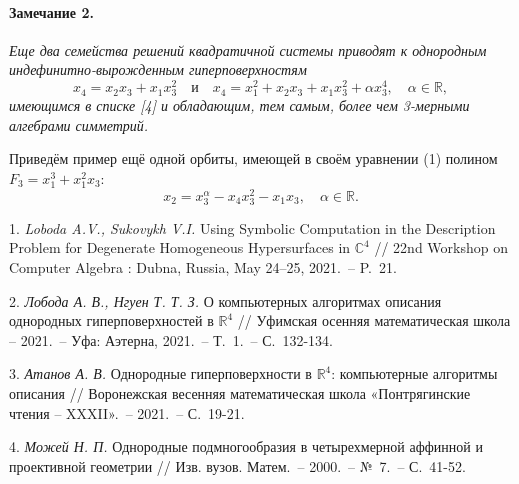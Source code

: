 \paragraph{Замечание 2.} {\it
	Еще два семейства решений квадратичной системы приводят к однородным индефинитно-вы\-рож\-ден\-ным гиперповерхностям
	\begin{equation*}
		x_4 = x_2 x_3 + x_1 x_3^2 \quad \text{и} \quad x_4 = x_1^2 + x_2 x_3 + x_1 x_3^2 + \alpha x_3^4,  \quad \alpha \in \mathbb{R},
	\end{equation*}
	имеющимся в списке [4] и обладающим, тем самым, более чем 3-мерными алгебрами симметрий. 
}

Приведём пример ещё одной орбиты, имеющей в своём уравнении (1) полином $F_3 = x_1^3 + x_1^2x_3$: \begin{equation*}
	x_2 = x_3^{\alpha} - x_4x_3^2 - x_1x_3, \quad \alpha \in \mathbb{R}.
\end{equation*}

\litlist

1. {\it Loboda A.V., Sukovykh V.I.} Using Symbolic Computation in the Description
Problem for Degenerate Homogeneous Hy\-per\-sur\-fa\-ces in $\mathbb{C}^4$ // 22nd Workshop on Computer Algebra : Dubna, Russia, May 24–25, 2021.~-- P.~21.

2. {\it Лобода А. В., Нгуен Т. Т. З.} О компьютерных алгоритмах описания однородных гиперповерхностей в $\mathbb{R}^4$ // Уфимская осенняя математическая школа -- 2021.~-- Уфа: Аэтерна, 2021.~-- Т.~1.~-- С.~132-134.

3. {\it Атанов А. В.} Однородные гиперповерхности в $\mathbb{R}^4$: компьютерные алгоритмы описания // Воронежская весенняя математическая школа «Понтрягинские чтения -- XXXII».~-- 2021.~-- С.~19-21.

4. {\it Можей Н. П.} Однородные подмногообразия в четырехмерной аффинной и проективной геометрии // Изв. вузов. Матем.~-- 2000.~-- №~7.~-- С.~41-52.

